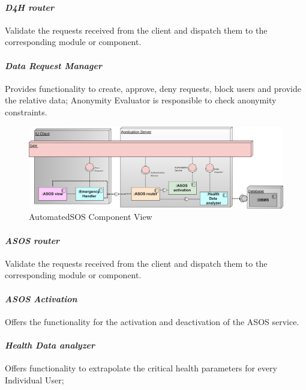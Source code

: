 \paragraph{\textit{D4H router}} Validate the requests received from the client and dispatch them to the corresponding module or component.
\paragraph{\textit{Data Request Manager}} Provides functionality to create, approve, deny requests, block users and provide the relative data; Anonymity Evaluator is responsible to check anonymity constraints. 
\begin{figure}[H]
 \caption{AutomatedSOS Component View}
\centering
\includegraphics[width = \textwidth]{sections/architecturalDesign/ASOSDiagram.png}
\end{figure}
\paragraph{\textit{ASOS router}} Validate the requests received from the client and dispatch them to the corresponding module or component.
\paragraph{\textit{ASOS Activation}} Offers the functionality for the activation and deactivation of the ASOS service.
\paragraph{\textit{Health Data analyzer}} Offers functionality to extrapolate the critical health parameters for every Individual User;
